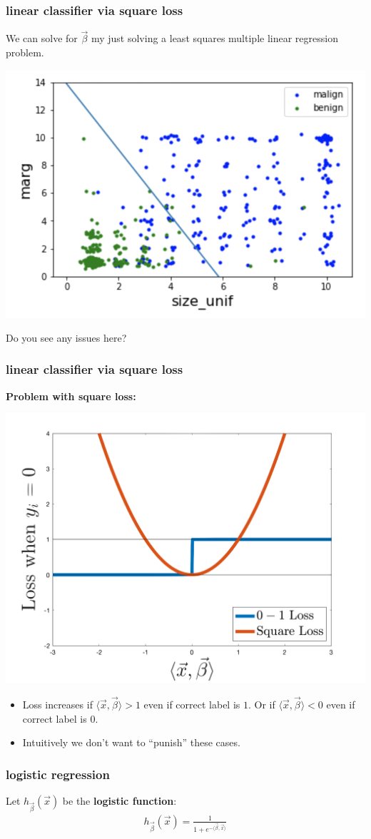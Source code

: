 \documentclass[handout,compress]{beamer}
\begin{document}
\begin{frame}
	\frametitle{linear classifier via square loss}
	We can solve for $\vec{\beta}$ my just solving a least squares multiple linear regression problem.
	\begin{center}
		\includegraphics[width=.5\textwidth]{squareloss.png}
		\vspace{-.5em}
	\end{center}
	Do you see any issues here?
\end{frame}

\begin{frame}
	\frametitle{linear classifier via square loss}
	\textbf{Problem with square loss:}
	\vspace{-.5em}
	\begin{center}
		\includegraphics[width=.5\textwidth]{square_loss_compare.png}
		\vspace{-.5em}
	\end{center}
	\begin{itemize}
		\item Loss increases if $\langle \vec{x},\vec{\beta}\rangle > 1$ even if correct label is $1$. Or if $\langle \vec{x},\vec{\beta}\rangle < 0$ even if correct label is $0$.
		\item Intuitively we don't want to ``punish'' these cases.
	\end{itemize}
\end{frame}

\begin{frame}[t]
	\frametitle{logistic regression}
	Let $h_{\vec{\beta}}(\vec{x})$ be the \textbf{\alert{logistic function}}:
	\begin{align*}
		h_{\vec{\beta}}(\vec{x}) = \frac{1}{1 + e^{-\langle\vec{\beta},\vec{x}\rangle}}
	\end{align*}
\end{frame}
\end{document}
